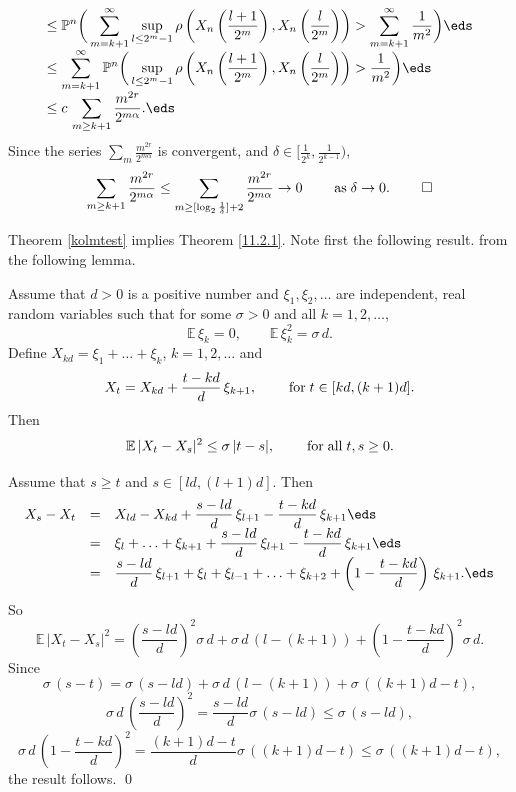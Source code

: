\documentclass[preprint]{imsart}
\def\P{\mathbb P}
\def\E{\mathbb E}
\def\ds{\displaystyle}
\begin{document}
{$$\begin{array}{l}
    \ds\leq
 \P^n \bigg(
 \sum_{m=k+1}^\infty
\sup_{l\leq 2^m-1}
\rho\left(X_n\left(\frac{l+1}{2^m} \right),
X_n\left(\frac{l}{2^m} \right)\right)
>\sum_{m=k+1}^\infty \frac{1}{m^2} \bigg)
\eds
\\ \ds\leq
\sum_{m=k+1}^\infty
\P^n \bigg(
\sup_{l\leq 2^m-1}
\rho\left(X_n\left(\frac{l+1}{2^m} \right),
X_n\left(\frac{l}{2^m} \right)\right)
>  \frac{1}{m^2} \bigg)
\eds \\ \ds
\leq
 c\, \sum_{m\geq k+1}
 \frac{m^{2r}}{2^{m\alpha}}.
 \eds
  \end{array}
$$
Since the series $\sum_{m}
 \frac{m^{2r}}{2^{m\alpha}}$ is convergent, and
$\delta\in \Big[\frac{1}{2^k},\frac{1}{2^{k-1}}\Big)$,
$$
\sum_{m\geq k+1}
 \frac{m^{2r}}{2^{m\alpha}} \leq
 \sum_{m\geq [\log_2\frac{1}{\delta}]+2}
 \frac{m^{2r}}{2^{m\alpha}}\to 0
 \qquad {\;\rm as\;} \delta\to 0. \; \qed
$$

Theorem \ref{kolmtest} implies Theorem \ref{11.2.1}. Note first the following result.
from the following lemma.

\begin{Lemma}\label{perkolmotest}
Assume that $d >0$ is a positive number and
$\xi_1,\xi_2,\ldots $ are independent, real random
variables such that for some $\sigma >0$ and all
$k=1,2,\ldots$,
$$
\E\, \xi_k=0,\qquad \E\, \xi_k^2=\sigma\, d.
$$
Define $X_{kd}= \xi_1+\ldots+\xi_k$, $k=1,2,\ldots$ and
$$
X_t=X_{kd} +\frac{t-kd}{d}\, \xi_{k+1},\qquad {\rm \;
for
\;} t\in [kd,(k+1)d].
$$
Then
$$
\E \, |X_t-X_s|^2\leq \sigma \, |t-s|,\qquad {\rm \; for
\;all\; } t,s\geq 0.
$$
\end{Lemma}

Assume that $s\geq t$ and $ s\in [ld,(l+1)d]$. Then
$$
  \begin{array}{lll}
    X_s-X_t&= & \ds
    X_{ld}-X_{kd} +
\frac{s-ld}{d}\, \xi_{l+1}
- \frac{t-kd}{d}\, \xi_{k+1}
    \eds\\
    &= & \ds
\xi_l+\ldots+\xi_{k+1} +
\frac{s-ld}{d}\, \xi_{l+1}
- \frac{t-kd}{d}\, \xi_{k+1}
\eds\\
    &= & \ds
\frac{s-ld}{d}\, \xi_{l+1}
+\xi_l +\xi_{l-1}+\ldots +\xi_{k+2}+
\left(
1- \frac{t-kd}{d}\right)\, \xi_{k+1}.
\eds
  \end{array}
$$
So
$$
\E \, |X_t-X_s|^2 = \left( \frac{s-ld}{d}\right)^2
\sigma\, d + \sigma \, d \, (l-(k+1)) +
\left(
1- \frac{t-kd}{d}\right)^2\sigma \, d.
$$
Since
$$
\sigma\, (s-t) = \sigma \, (s-ld)+\sigma \, d \, (l-(k+1))
+\sigma \,   ((k+1)d-t),
$$
$$
\sigma\, d \,\left( \frac{s-ld}{d}\right)^2
=
  \frac{s-ld}{d} \sigma\, (s-ld) \leq \sigma\, (s-ld),
$$
$$
\sigma \, d\, \left(
1- \frac{t-kd}{d}\right)^2 =
\frac{(k+1)d-t}{d} \sigma\, ((k+1)d-t)\leq
\sigma \, ((k+1)d-t),
$$
the result follows. \qed
\vspace{2mm}

}
\end{document}
